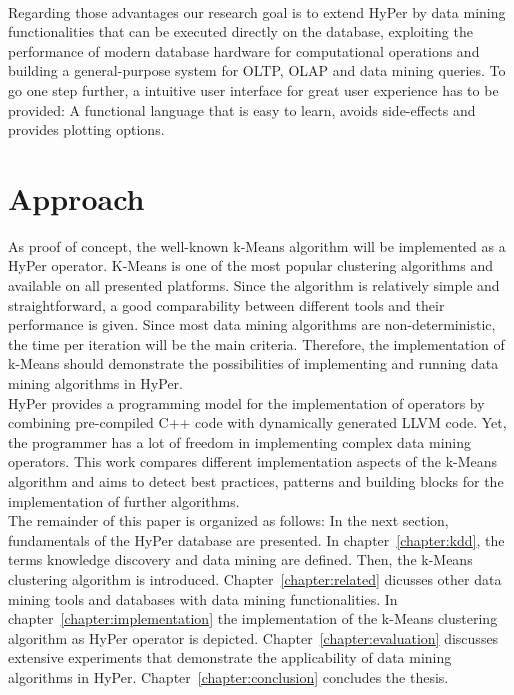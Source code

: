 \\
Regarding those advantages our research goal is to extend HyPer by data mining functionalities that can be executed directly on the database, exploiting the performance of modern database hardware for computational operations and building a general-purpose system for OLTP, OLAP and data mining queries. To go one step further, a intuitive user interface for great user experience has to be provided: A functional language that is easy to learn, avoids side-effects and provides plotting options.


\section{Approach}
As proof of concept, the well-known k-Means algorithm will be implemented as a HyPer operator. K-Means is one of the most popular  clustering algorithms and available on all presented platforms. Since the algorithm is relatively simple and straightforward, a good comparability between different tools and their performance is given. Since most data mining algorithms are non-deterministic, the time per iteration will be the main criteria. Therefore, the implementation of k-Means should demonstrate the possibilities of implementing and running data mining algorithms in HyPer.
\\
HyPer provides a programming model for the implementation of operators by combining pre-compiled C++ code with dynamically generated LLVM code. Yet, the programmer has a lot of freedom in implementing complex data mining operators. This work compares different implementation aspects of the k-Means algorithm and aims to detect best practices, patterns and building blocks for the implementation of further algorithms.
\\
The remainder of this paper is organized as follows: In the next section, fundamentals of the HyPer database are presented. In chapter~\ref{chapter:kdd}, the terms knowledge discovery and data mining are defined. Then, the k-Means clustering algorithm is introduced. Chapter~\ref{chapter:related} dicusses other data mining tools and databases with data mining functionalities. In chapter~\ref{chapter:implementation} the implementation of the k-Means clustering algorithm as HyPer operator is depicted. Chapter~\ref{chapter:evaluation} discusses extensive experiments that demonstrate the applicability of data mining algorithms in HyPer. Chapter~\ref{chapter:conclusion} concludes the thesis.



